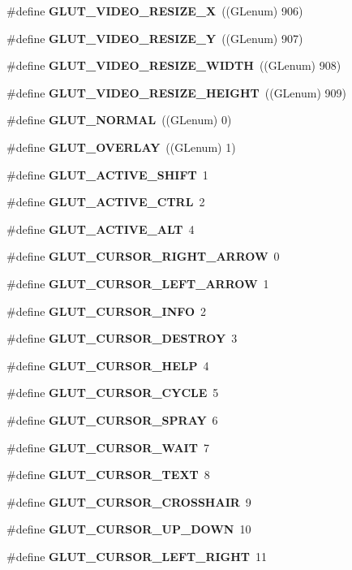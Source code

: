 \begin{DoxyCompactItemize}
\item 
\#define {\bf G\+L\+U\+T\+\_\+\+V\+I\+D\+E\+O\+\_\+\+R\+E\+S\+I\+Z\+E\+\_\+X}~((G\+Lenum) 906)
\item 
\#define {\bf G\+L\+U\+T\+\_\+\+V\+I\+D\+E\+O\+\_\+\+R\+E\+S\+I\+Z\+E\+\_\+Y}~((G\+Lenum) 907)
\item 
\#define {\bf G\+L\+U\+T\+\_\+\+V\+I\+D\+E\+O\+\_\+\+R\+E\+S\+I\+Z\+E\+\_\+\+W\+I\+D\+TH}~((G\+Lenum) 908)
\item 
\#define {\bf G\+L\+U\+T\+\_\+\+V\+I\+D\+E\+O\+\_\+\+R\+E\+S\+I\+Z\+E\+\_\+\+H\+E\+I\+G\+HT}~((G\+Lenum) 909)
\item 
\#define {\bf G\+L\+U\+T\+\_\+\+N\+O\+R\+M\+AL}~((G\+Lenum) 0)
\item 
\#define {\bf G\+L\+U\+T\+\_\+\+O\+V\+E\+R\+L\+AY}~((G\+Lenum) 1)
\item 
\#define {\bf G\+L\+U\+T\+\_\+\+A\+C\+T\+I\+V\+E\+\_\+\+S\+H\+I\+FT}~1
\item 
\#define {\bf G\+L\+U\+T\+\_\+\+A\+C\+T\+I\+V\+E\+\_\+\+C\+T\+RL}~2
\item 
\#define {\bf G\+L\+U\+T\+\_\+\+A\+C\+T\+I\+V\+E\+\_\+\+A\+LT}~4
\item 
\#define {\bf G\+L\+U\+T\+\_\+\+C\+U\+R\+S\+O\+R\+\_\+\+R\+I\+G\+H\+T\+\_\+\+A\+R\+R\+OW}~0
\item 
\#define {\bf G\+L\+U\+T\+\_\+\+C\+U\+R\+S\+O\+R\+\_\+\+L\+E\+F\+T\+\_\+\+A\+R\+R\+OW}~1
\item 
\#define {\bf G\+L\+U\+T\+\_\+\+C\+U\+R\+S\+O\+R\+\_\+\+I\+N\+FO}~2
\item 
\#define {\bf G\+L\+U\+T\+\_\+\+C\+U\+R\+S\+O\+R\+\_\+\+D\+E\+S\+T\+R\+OY}~3
\item 
\#define {\bf G\+L\+U\+T\+\_\+\+C\+U\+R\+S\+O\+R\+\_\+\+H\+E\+LP}~4
\item 
\#define {\bf G\+L\+U\+T\+\_\+\+C\+U\+R\+S\+O\+R\+\_\+\+C\+Y\+C\+LE}~5
\item 
\#define {\bf G\+L\+U\+T\+\_\+\+C\+U\+R\+S\+O\+R\+\_\+\+S\+P\+R\+AY}~6
\item 
\#define {\bf G\+L\+U\+T\+\_\+\+C\+U\+R\+S\+O\+R\+\_\+\+W\+A\+IT}~7
\item 
\#define {\bf G\+L\+U\+T\+\_\+\+C\+U\+R\+S\+O\+R\+\_\+\+T\+E\+XT}~8
\item 
\#define {\bf G\+L\+U\+T\+\_\+\+C\+U\+R\+S\+O\+R\+\_\+\+C\+R\+O\+S\+S\+H\+A\+IR}~9
\item 
\#define {\bf G\+L\+U\+T\+\_\+\+C\+U\+R\+S\+O\+R\+\_\+\+U\+P\+\_\+\+D\+O\+WN}~10
\item 
\#define {\bf G\+L\+U\+T\+\_\+\+C\+U\+R\+S\+O\+R\+\_\+\+L\+E\+F\+T\+\_\+\+R\+I\+G\+HT}~11

\end{DoxyCompactItemize}
